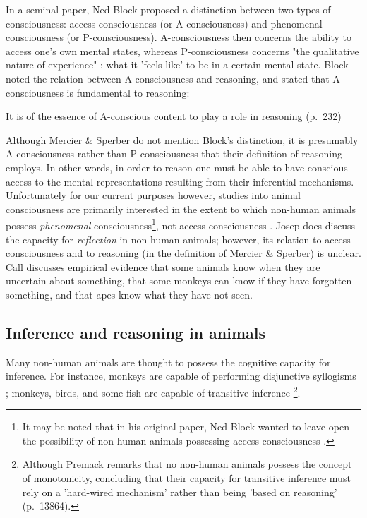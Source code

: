 In a seminal \citeyear{Block95} paper, Ned Block proposed a distinction between two types of consciousness: access-consciousness (or A-consciousness) and phenomenal consciousness (or P-consciousness). A-consciousness then concerns the ability to access one's own mental states, whereas P-consciousness concerns "the qualitative nature of experience" \citep[p.~52]{Andrews15}: what it 'feels like' to be in a certain mental state. 
Block noted the relation between A-consciousness and reasoning, and stated that A-consciousness is fundamental to reasoning:
\begin{quoting}
    It is of the essence of A-conscious content to play a role in reasoning
\hfill (p.~232)
\end{quoting}
Although Mercier \& Sperber do not mention Block's distinction, it is presumably A-consciousness rather than P-consciousness that their definition of reasoning employs. In other words, in order to reason one must be able to have conscious access to the mental representations resulting from their inferential mechanisms.
Unfortunately for our current purposes however, studies into animal consciousness are primarily interested in the extent to which non-human animals possess \emph{phenomenal} consciousness\footnote{It may be noted that in his original paper, Ned Block wanted to leave open the possibility of non-human animals possessing access-consciousness \citep{Block95}.}, not access consciousness \citep{Andrews15, Carruthers18}.
Josep \citet{Call06} does discuss the capacity for \emph{reflection} in non-human animals; however, its relation to access consciousness and to reasoning (in the definition of Mercier \& Sperber) is unclear. Call discusses empirical evidence that some animals know when they are uncertain about something, that some monkeys can know if they have forgotten something, and that apes know what they have not seen. 

\subsection{Inference and reasoning in animals}

Many non-human animals are thought to possess the cognitive capacity for inference. For instance, monkeys are capable of performing disjunctive syllogisms \citep{Ferrigno21}; monkeys, birds, and some fish are capable of transitive inference \citep{Premack07}\footnote{Although Premack remarks that no non-human animals possess the concept of monotonicity, concluding that their capacity for transitive inference must rely on a 'hard-wired mechanism' rather than being 'based on reasoning' (p.~13864).}.

